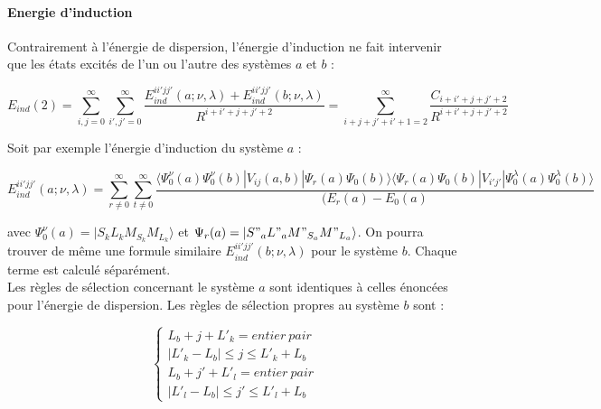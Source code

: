 \documentclass[12pt,a4paper]{book}
\begin{document}
	
	\paragraph{Energie d’induction}
	
	Contrairement à l'énergie de dispersion, l'énergie d'induction ne fait intervenir que les états excités de l'un ou l'autre des systèmes $a$ et $b$ : 
	
	\begin{equation}
	E_{ind}(2) = \sum_{i,j=0}^{\infty} \sum_{i',j'=0}^{\infty} \frac{E_{ind}^{ii'jj'} (a; \nu , \lambda) + E_{ind}^{ii'jj'} (b; \nu , \lambda)}{R^{i+i'+j+j'+2}} = \sum_{i+j+j'+i'+1=2}^{\infty} \frac{C_{i+i'+j+j'+2}}{R^{i+i'+j+j'+2}}
	\end{equation}
	
	Soit par exemple l'énergie d'induction du système $a$ :
	
	\begin{equation}
	E_{ind}^{ii'jj'} (a;\nu , \lambda) = \sum_{r \neq 0}^{\infty} \sum_{t\neq 0}^{\infty} \frac{\langle \Psi_{0}^{\nu} (a) \Psi_{0}^{\nu} (b) |V_{ij} (a,b)|\Psi_{r} (a) \Psi_{0} (b) \rangle  \langle \Psi_{r} (a)\Psi_{0} (b) |V_{i'j'}|\Psi_{0}^{\lambda} (a) \Psi_{0}^{\lambda}(b) \rangle}{(E_{r} (a) - E_{0}(a)}
	\end{equation}
	
	\noindent avec $\Psi_{0}^{\nu} (a) = |S_{k} L_{k} M_{S_{k}} M_{L_{k}}\rangle$ et $\Psi_{r}(a) = |S"_{a} L"_{a} M"_{S_{a}} M"_{L_{a}}\rangle$. On pourra trouver de même une formule similaire $E_{ind}^{ii'jj'} (b;\nu , \lambda)$ pour le système $b$. Chaque terme est calculé séparément.\\
	
	Les règles de sélection concernant le système $a$ sont identiques à celles énoncées pour l'énergie de dispersion.
	Les règles de sélection propres au système $b$ sont : 
	
	\begin{equation}
	\begin{cases}
	L_{b} + j + L'_{k} = entier\ pair \\
	|L'_{k} - L_{b}| \leq j \leq L'_{k} + L_{b} \\
	L_{b} + j' + L'_{l} = entier\ pair \\
	|L'_{l} - L_{b}| \leq j' \leq L'_{l} + L_{b}
	\end{cases}
	\end{equation}
	
\end{document}

